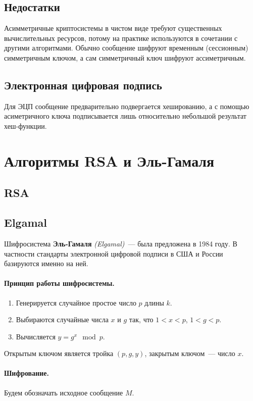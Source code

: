 \documentclass[a4paper,10pt]{article}
\begin{document}
\subsection{Недостатки} 
Асимметричные криптосистемы в чистом виде требуют существенных вычислительных ресурсов, потому на практике используются в сочетании с
другими алгоритмами. Обычно сообщение шифруют временным (сессионным) симметричным ключом, а сам симметричный ключ шифруют ассиметричным.

\subsection{Электронная цифровая подпись}
Для ЭЦП сообщение предварительно подвергается хешированию, а с помощью асиметричного ключа подписывается лишь относительно небольшой
результат хеш-функции.

\section{Алгоритмы RSA и Эль-Гамаля}
\subsection{RSA}
\subsection{Elgamal}
Шифросистема {\bf Эль-Гамаля} {\it (Elgamal)}~--- была предложена в 1984 году. 
В частности стандарты электронной цифровой подписи в США и России базируются именно на ней.
\paragraph{Принцип работы шифросистемы.} 
\begin{enumerate}
   \item Генерируется случайное простое число $p$ длины $k$.
   \item Выбираются случайные числа $x$ и $g$ так, что $1 < x < p$, $1 < g < p$.
   \item Вычисляется $y = g^x \mod p$.
\end{enumerate}

Открытым ключом является тройка $(p,g,y)$, закрытым ключом~---  число $x$.

\paragraph{Шифрование.}
Будем обозначать исходное сообщение $M$.
\end{document}
